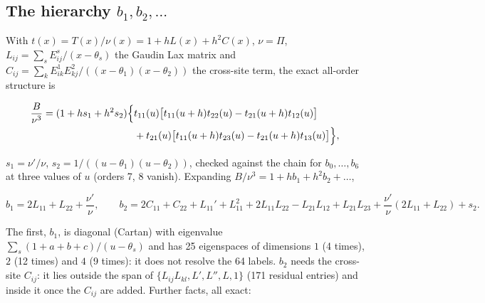 \documentclass[11pt]{article}
\begin{document}
\subsection{The hierarchy \texorpdfstring{$b_1,b_2,\dots$}{b,b,}}\label{sec:bk}

With $t(x)=T(x)/\nu(x)=1+hL(x)+h^2C(x)$, $\nu=\Pi$, $L_{ij}=\sum_sE^{s}_{ij}/(x-\theta_s)$ the Gaudin Lax matrix and $C_{ij}=\sum_kE^1_{ik}E^2_{kj}/((x-\theta_1)(x-\theta_2))$ the cross-site term, the exact all-order structure is

\begin{equation}
\begin{aligned}
\frac B{\nu^3}=(1+hs_1+h^2s_2)\Bigl\{&t_{11}(u)\bigl[t_{11}(u+h)t_{22}(u)-t_{21}(u+h)t_{12}(u)\bigr]\\
&+t_{21}(u)\bigl[t_{11}(u+h)t_{23}(u)-t_{21}(u+h)t_{13}(u)\bigr]\Bigr\},
\end{aligned}\label{eq:Bexact}
\end{equation}

$s_1=\nu'/\nu$, $s_2=1/((u-\theta_1)(u-\theta_2))$, checked against the chain for $b_0,\dots,b_6$ at three values of $u$ (orders 7, 8 vanish).
Expanding $B/\nu^3=1+hb_1+h^2b_2+\dots$,

\begin{equation}
b_1=2L_{11}+L_{22}+\frac{\nu'}\nu,\qquad b_2=2C_{11}+C_{22}+L_{11}'+L_{11}^2+2L_{11}L_{22}-L_{21}L_{12}+L_{21}L_{23}+\frac{\nu'}\nu(2L_{11}+L_{22})+s_2.\label{eq:b12}
\end{equation}

The first, $b_1$, is diagonal (Cartan) with eigenvalue $\sum_s(1+a+b+c)/(u-\theta_s)$ and has 25 eigenspaces of dimensions $1$ (4 times), $2$ (12 times) and $4$ (9 times): it does not resolve the 64 labels. $b_2$ needs the cross-site $C_{ij}$: it lies outside the span of $\{L_{ij}L_{kl},L',L'',L,1\}$ (171 residual entries) and inside it once the $C_{ij}$ are added.
Further facts, all exact:
\end{document}
